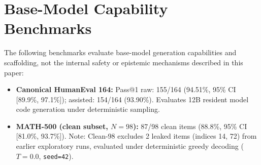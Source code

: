 \documentclass[10pt,twocolumn]{article}
\begin{document}
\appendix
\section{Base-Model Capability Benchmarks}
The following benchmarks evaluate base-model generation capabilities and scaffolding, not the internal safety or epistemic mechanisms described in this paper:
\begin{itemize}
    \item \textbf{Canonical HumanEval 164:} Pass@1 raw: 155/164 (94.51\%, 95\% CI [89.9\%, 97.1\%]); assisted: 154/164 (93.90\%). Evaluates 12B resident model code generation under deterministic sampling.
    \item \textbf{MATH-500 (clean subset, $N=98$):} 87/98 clean items (88.8\%, 95\% CI [81.0\%, 93.7\%]). Note: Clean-98 excludes 2 leaked items (indices 14, 72) from earlier exploratory runs, evaluated under deterministic greedy decoding ($T=0.0$, \texttt{seed=42}).
\end{itemize}

\end{document}

